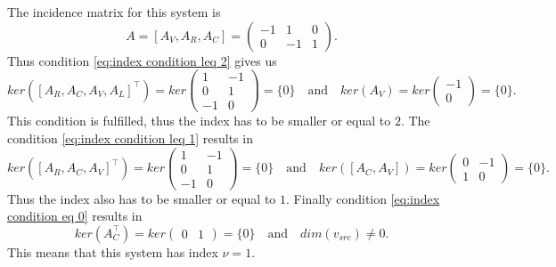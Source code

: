 \begin{example1}
	The incidence matrix for this system is
	\begin{displaymath}
		A = [A_V, A_R, A_C] = 
		\left(
		\begin{matrix}
			-1 & 1 & 0 \\
			0 & -1 & 1 
		\end{matrix}
		\right).
	\end{displaymath} 
	Thus condition \eqref{eq:index condition leq 2} gives us
	\begin{displaymath}
		ker([A_R, A_C, A_V, A_L]^\top) = ker
		\left(
		\begin{matrix}
			1 & -1 \\
			0 & 1 \\
			-1 & 0
		\end{matrix}
		\right)
		= \{0\} 
		\quad \text{and} \quad 
		ker(A_V) = ker
		\left(
		\begin{matrix}
			-1 \\
			0
		\end{matrix}
		\right) = \{0\}.
	\end{displaymath}
	This condition is fulfilled, thus the index has to be smaller or equal to $2$.
	The condition \eqref{eq:index condition leq 1} results in
	\begin{displaymath}
		ker([A_R, A_C, A_V]^\top) = ker
		\left(
		\begin{matrix}
			1 & -1 \\
			0 & 1 \\
			-1 & 0
		\end{matrix}
		\right) 
		= \{0\} 
		\quad \text{and} \quad
		ker([A_C, A_V]) = ker
		\left(
		\begin{matrix}
			0 & -1\\
			1 & 0
		\end{matrix}
		\right) = \{0\}.
	\end{displaymath}
	Thus the index also has to be smaller or equal to $1$. 
	Finally condition \eqref{eq:index condition eq 0} results in
	\begin{displaymath}
		ker(A_C^\top) = ker
		\left(
		\begin{matrix}
			0 & 1
		\end{matrix}
		\right) 
		= \{0\} 
		\quad \text{and} \quad
		dim(v_{src}) \neq 0.
	\end{displaymath}
	This means that this system has index $\nu = 1$.
\end{example1}


